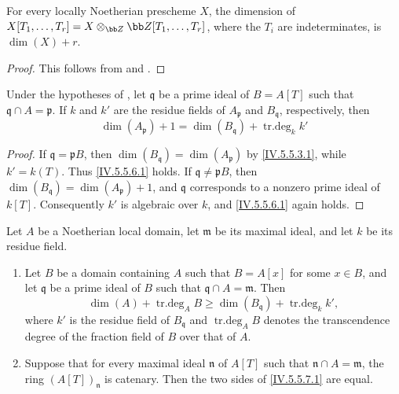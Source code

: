\begin{corollary}[5.5.5]
\label{IV.5.5.5}
For every locally Noetherian prescheme $X$, the dimension of $X[T_1,\ldots,T_r]
=X\otimes_{\bb Z}\bb Z[T_1,\ldots,T_r]$,
where the $T_i$ are indeterminates, is $\dim(X)+r$.
\end{corollary}

\begin{proof}
This follows from  and .
\end{proof}

\begin{corollary}[5.5.6]
\label{IV.5.5.6}
Under the hypotheses of , let $\mathfrak q$ be a
prime ideal of $B=A[T]$ such that
$\mathfrak q\cap A=\mathfrak p$.
If $k$ and $k'$ are the residue fields of $A_{\mathfrak p}$ and
$B_{\mathfrak q}$, respectively, then
\begin{equation}
\dim(A_{\mathfrak p})+1
 =\dim(B_{\mathfrak q})+\operatorname{tr.deg}_k k'
\tag{5.5.6.1}\label{IV.5.5.6.1}
\end{equation}
\end{corollary}

\begin{proof}

If $\mathfrak q=\mathfrak pB$, then $\dim(B_{\mathfrak q})=\dim(A_{\mathfrak p})$
by \eqref{IV.5.5.3.1}, while $k'=k(T)$.
Thus \eqref{IV.5.5.6.1} holds.
If $\mathfrak q\neq\mathfrak pB$, then $\dim(B_{\mathfrak q})=\dim(A_{\mathfrak p})+1$,
and $\mathfrak q$ corresponds to a nonzero prime ideal of $k[T]$.
Consequently $k'$ is algebraic over $k$, and
\eqref{IV.5.5.6.1} again holds.
\end{proof}

\begin{lemma}[5.5.7]
\label{IV.5.5.7}
Let $A$ be a Noetherian local domain, let $\mathfrak m$ be its
maximal ideal, and let $k$ be its residue field.
\begin{enumerate}[{\rm(i)}]
\item
{}
\label{IV.5.5.7.i}
Let $B$ be a domain containing $A$ such that $B=A[x]$ for some
$x\in B$, and let $\mathfrak q$ be a prime ideal of $B$ such that
$\mathfrak q\cap A=\mathfrak m$.
Then
\begin{equation}
\dim(A)+\operatorname{tr.deg}_A B
 \geq\dim(B_{\mathfrak q})+\operatorname{tr.deg}_k k',
\tag{5.5.7.1}\label{IV.5.5.7.1}
\end{equation}
where $k'$ is the residue field of $B_{\mathfrak q}$ and
$\operatorname{tr.deg}_A B$ denotes the transcendence degree of the
fraction field of $B$ over that of $A$.

\item
{}
\label{IV.5.5.7.ii}
Suppose that for every maximal ideal $\mathfrak n$ of $A[T]$ such
that $\mathfrak n\cap A=\mathfrak m$, the ring
$(A[T])_{\mathfrak n}$ is catenary.
Then the two sides of \eqref{IV.5.5.7.1} are equal.
\end{enumerate}
\end{lemma}

